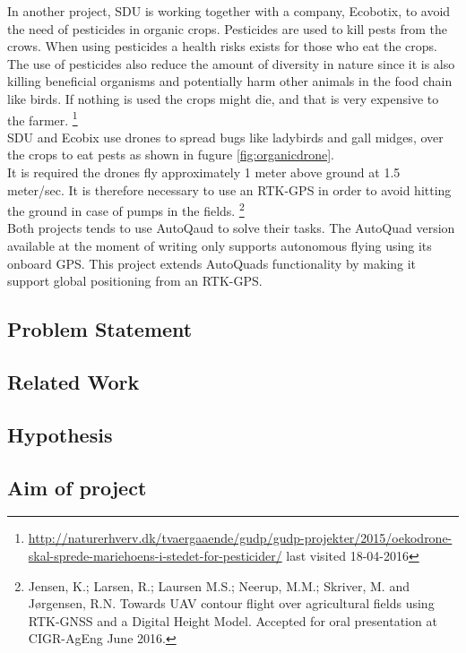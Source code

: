 In another project, SDU is working together with a company, Ecobotix, to avoid the need of pesticides in organic crops. Pesticides are used to kill pests from the crows. When using pesticides a health risks exists for those who eat the crops. The use of pesticides also reduce the amount of diversity in nature since it is also killing beneficial organisms and potentially harm other animals in the food chain like birds. If nothing is used the crops might die, and that is very expensive to the farmer. \footnote{\url{http://naturerhverv.dk/tvaergaaende/gudp/gudp-projekter/2015/oekodrone-skal-sprede-mariehoens-i-stedet-for-pesticider/} last visited 18-04-2016}\\
SDU and Ecobix use drones to spread bugs like ladybirds and gall midges, over the crops to eat pests as shown in fugure \ref{fig:organicdrone}. \\
It is required the drones fly approximately 1 meter above ground at 1.5 meter/sec. It is therefore necessary to use an RTK-GPS in order to avoid hitting the ground in case of pumps in the fields. \footnote{Jensen, K.; Larsen, R.; Laursen M.S.; Neerup, M.M.; Skriver, M. and Jørgensen, R.N. Towards UAV contour flight over agricultural fields using RTK-GNSS and a Digital Height Model. Accepted for oral presentation at CIGR-AgEng June 2016.}\\
Both projects tends to use AutoQaud to solve their tasks. The AutoQuad version available at the moment of writing only supports autonomous flying using its onboard GPS. This project extends AutoQuads functionality by making it support global positioning from an RTK-GPS. 

\newpage
\subsection{Problem Statement}

\subsection{Related Work}

\subsection{Hypothesis}

\subsection{Aim of project}
